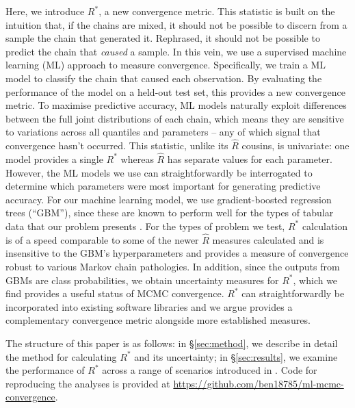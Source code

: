 \documentclass{article}
\begin{document}
Here, we introduce $R^*$, a new convergence metric. This statistic is built on the intuition that, if the chains are mixed, it should not be possible to discern from a sample the chain that generated it. Rephrased, it should not be possible to predict the chain that \textit{caused} a sample. In this vein, we use a supervised machine learning (ML) approach to measure convergence. Specifically, we train a ML model to classify the chain that caused each observation. By evaluating the performance of the model on a held-out test set, this provides a new convergence metric. To maximise predictive accuracy, ML models naturally exploit differences between the full joint distributions of each chain, which means they are sensitive to variations across all quantiles and parameters -- any of which signal that convergence hasn't occurred. This statistic, unlike its $\hat{R}$ cousins, is univariate: one model provides a single $R^*$ whereas $\hat{R}$ has separate values for each parameter. However, the ML models we use can straightforwardly be interrogated to determine which parameters were most important for generating predictive accuracy. For our machine learning model, we use gradient-boosted regression trees \cite{friedman2001greedy,greenwell2019package} (``GBM''), since these are known to perform well for the types of tabular data that our problem presents \cite{chollet2018}. For the types of problem we test, $R^*$ calculation is of a speed comparable to some of the newer $\hat{R}$ measures calculated and is insensitive to the GBM's hyperparameters and provides a measure of convergence robust to various Markov chain pathologies. In addition, since the outputs from GBMs are class probabilities, we obtain uncertainty measures for $R^*$, which we find provides a useful status of MCMC convergence. $R^*$ can straightforwardly be incorporated into existing software libraries and we argue provides a complementary convergence metric alongside more established measures.

The structure of this paper is as follows: in \S\ref{sec:method}, we describe in detail the method for calculating $R^*$ and its uncertainty; in \S\ref{sec:results}, we examine the performance of $R^*$ across a range of scenarios introduced in \cite{vehtari2019rank}. Code for reproducing the analyses is provided at \url{https://github.com/ben18785/ml-mcmc-convergence}.

\end{document}
